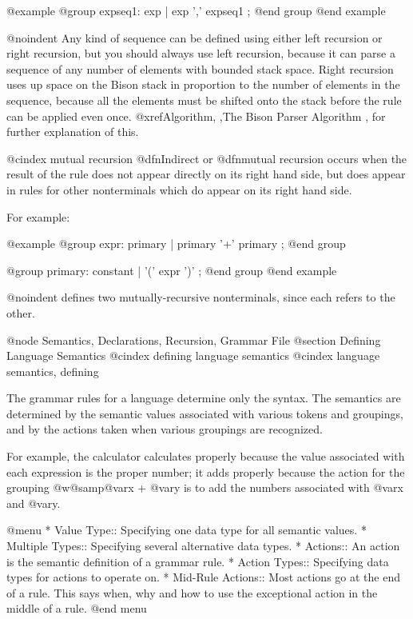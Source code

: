 {{{{{{{{{{{{{{{{{{@example
@group
expseq1:  exp
        | exp ',' expseq1
        ;
@end group
@end example

@noindent
Any kind of sequence can be defined using either left recursion or
right recursion, but you should always use left recursion, because it
can parse a sequence of any number of elements with bounded stack
space.  Right recursion uses up space on the Bison stack in proportion
to the number of elements in the sequence, because all the elements
must be shifted onto the stack before the rule can be applied even
once.  @xref{Algorithm, ,The Bison Parser Algorithm }, for
further explanation of this.

@cindex mutual recursion
@dfn{Indirect} or @dfn{mutual} recursion occurs when the result of the
rule does not appear directly on its right hand side, but does appear
in rules for other nonterminals which do appear on its right hand
side.  

For example:

@example
@group
expr:     primary
        | primary '+' primary
        ;
@end group

@group
primary:  constant
        | '(' expr ')'
        ;
@end group
@end example

@noindent
defines two mutually-recursive nonterminals, since each refers to the
other.

@node Semantics, Declarations, Recursion, Grammar File
@section Defining Language Semantics
@cindex defining language semantics
@cindex language semantics, defining 

The grammar rules for a language determine only the syntax.  The semantics
are determined by the semantic values associated with various tokens and
groupings, and by the actions taken when various groupings are recognized.

For example, the calculator calculates properly because the value
associated with each expression is the proper number; it adds properly
because the action for the grouping @w{@samp{@var{x} + @var{y}}} is to add
the numbers associated with @var{x} and @var{y}.

@menu
* Value Type::        Specifying one data type for all semantic values.
* Multiple Types::    Specifying several alternative data types.
* Actions::           An action is the semantic definition of a grammar rule.
* Action Types::      Specifying data types for actions to operate on.
* Mid-Rule Actions::  Most actions go at the end of a rule.
                      This says when, why and how to use the exceptional
                        action in the middle of a rule.
@end menu

}}}}}}}}}}}}}}}}}}
